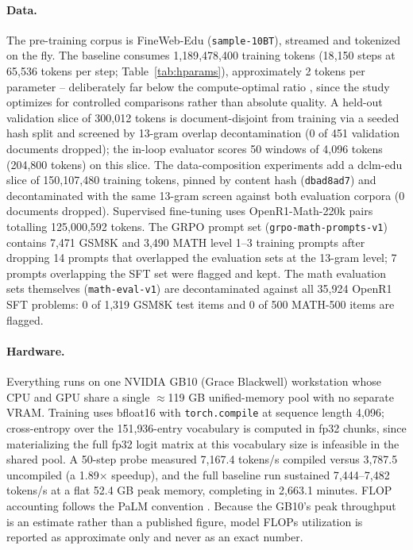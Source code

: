 \paragraph{Data.}
The pre-training corpus is FineWeb-Edu \citep{penedo2024fineweb}
(\texttt{sample-10BT}), streamed and tokenized on the fly. The baseline
consumes 1{,}189{,}478{,}400 training tokens (18{,}150 steps at
65{,}536 tokens per step; Table~\ref{tab:hparams}), approximately
2 tokens per parameter -- deliberately far below the compute-optimal
ratio \citep{hoffmann2022training}, since the study optimizes for
controlled comparisons rather than absolute quality. A held-out
validation slice of 300{,}012 tokens is document-disjoint from training
via a seeded hash split and screened by 13-gram overlap decontamination
(0 of 451 validation documents dropped); the in-loop evaluator scores
50 windows of 4{,}096 tokens (204{,}800 tokens) on this slice. The
data-composition experiments add a dclm-edu slice \citep{li2024datacomp}
of 150{,}107{,}480 training tokens, pinned by content hash
(\texttt{dbad8ad7}) and decontaminated with the same 13-gram screen
against both evaluation corpora (0 documents dropped). Supervised
fine-tuning uses OpenR1-Math-220k pairs totalling 125{,}000{,}592
tokens. The GRPO prompt set (\texttt{grpo-math-prompts-v1}) contains
7{,}471 GSM8K and 3{,}490 MATH level 1--3 training prompts after
dropping 14 prompts that overlapped the evaluation sets at the 13-gram
level; 7 prompts overlapping the SFT set were flagged and kept. The math
evaluation sets themselves (\texttt{math-eval-v1}) are decontaminated
against all 35{,}924 OpenR1 SFT problems: 0 of 1{,}319 GSM8K test items
and 0 of 500 MATH-500 items are flagged.

\paragraph{Hardware.}
Everything runs on one NVIDIA GB10 (Grace Blackwell) workstation whose
CPU and GPU share a single $\approx$119 GB unified-memory pool with no
separate VRAM. Training uses bfloat16 with \texttt{torch.compile} at
sequence length 4{,}096; cross-entropy over the 151{,}936-entry
vocabulary is computed in fp32 chunks, since materializing the full fp32
logit matrix at this vocabulary size is infeasible in the shared pool.
A 50-step probe measured 7{,}167.4 tokens/s compiled versus 3{,}787.5
uncompiled (a 1.89$\times$ speedup), and the full baseline run sustained
7{,}444--7{,}482 tokens/s at a flat 52.4 GB peak memory, completing in
2{,}663.1 minutes. FLOP accounting follows the PaLM convention
\citep{chowdhery2022palm}. Because the GB10's peak throughput is an
estimate rather than a published figure, model FLOPs utilization is
reported as approximate only and never as an exact number.

